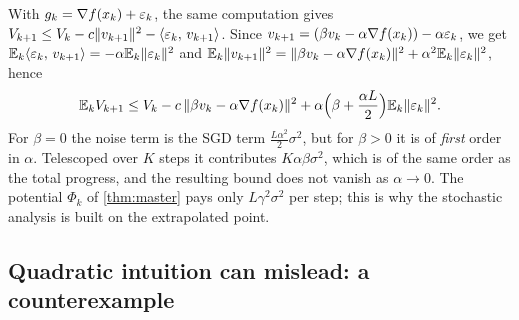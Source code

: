 \begin{remark}\label{rem:energy-noise}
With $g_k=\nabla f(x_k)+\varepsilon_k$, the same computation gives
$V_{k+1}\le V_k-c\lVert v_{k+1}\rVert^2-\langle \varepsilon_k,\, v_{k+1}\rangle$. Since
$v_{k+1}=(\beta v_k-\alpha\nabla f(x_k))-\alpha\varepsilon_k$, we get
$\mathbb{E}_k\langle \varepsilon_k,\, v_{k+1}\rangle=-\alpha\mathbb{E}_k\lVert \varepsilon_k\rVert^2$ and
$\mathbb{E}_k\lVert v_{k+1}\rVert^2=\lVert \beta v_k-\alpha\nabla f(x_k)\rVert^2+\alpha^2\mathbb{E}_k\lVert \varepsilon_k\rVert^2$, hence
\[
  \mathbb{E}_k V_{k+1}\le V_k-c\,\lVert \beta v_k-\alpha\nabla f(x_k)\rVert^2+\alpha\Bigl(\beta+\frac{\alpha L}{2}\Bigr)\mathbb{E}_k\lVert \varepsilon_k\rVert^2 .
\]
For $\beta=0$ the noise term is the SGD term $\frac{L\alpha^2}2\sigma^2$, but for $\beta>0$ it
is of \emph{first} order in $\alpha$. Telescoped over $K$ steps it contributes $K\alpha\beta\sigma^2$,
which is of the same order as the total progress, and the resulting bound does not vanish
as $\alpha\to0$. The potential $\Phi_k$ of \cref{thm:master} pays only $L\gamma^2\sigma^2$
per step; this is why the stochastic analysis is built on the extrapolated point.
\end{remark}

\subsection{Quadratic intuition can mislead: a counterexample}


